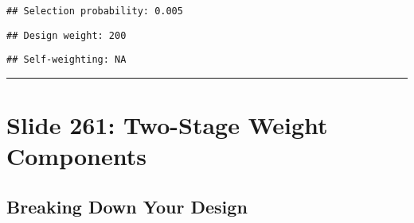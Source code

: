 \documentclass[
]{article}
\newenvironment{Shaded}{\begin{snugshade}}{\end{snugshade}}
\newcommand{\FunctionTok}[1]{\textcolor[rgb]{0.13,0.29,0.53}{\textbf{#1}}}
\newcommand{\NormalTok}[1]{#1}
\newcommand{\SpecialCharTok}[1]{\textcolor[rgb]{0.81,0.36,0.00}{\textbf{#1}}}
\newcommand{\StringTok}[1]{\textcolor[rgb]{0.31,0.60,0.02}{#1}}
\begin{document}
\begin{verbatim}
## Selection probability: 0.005
\end{verbatim}

\begin{Shaded}
\end{Shaded}

\begin{verbatim}
## Design weight: 200
\end{verbatim}

\begin{Shaded}
\end{Shaded}

\begin{verbatim}
## Self-weighting: NA
\end{verbatim}

\begin{center}\rule{0.5\linewidth}{0.5pt}\end{center}

\section{Slide 261: Two-Stage Weight
Components}\label{slide-261-two-stage-weight-components}

\subsection{Breaking Down Your Design}\label{breaking-down-your-design}
\end{document}
